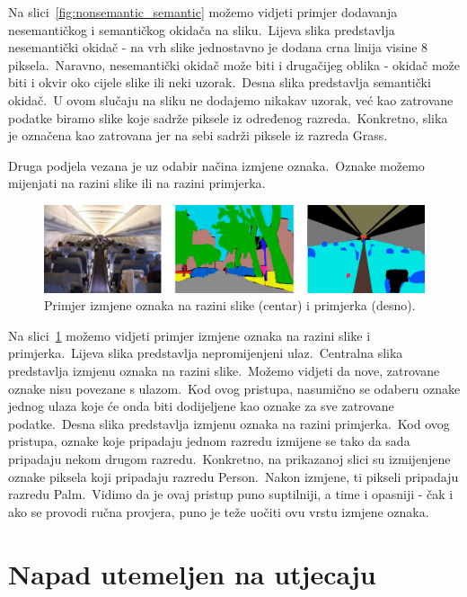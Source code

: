 \documentclass[times, utf8, seminar, numeric]{fer}
\begin{document}
Na slici~\ref{fig:nonsemantic_semantic} možemo vidjeti primjer dodavanja nesemantičkog i semantičkog okidača na sliku.\ 
Lijeva slika predstavlja nesemantički okidač - na vrh slike jednostavno je dodana crna linija visine 8 piksela.\ 
Naravno, nesemantički okidač može biti i drugačijeg oblika - okidač može biti i okvir oko cijele slike ili neki uzorak.\
Desna slika predstavlja semantički okidač.\ U ovom slučaju na sliku ne dodajemo nikakav uzorak, već kao zatrovane podatke biramo slike koje sadrže piksele iz određenog razreda.\ 
Konkretno, slika je označena kao zatrovana jer na sebi sadrži piksele iz razreda Grass.\ 
  
Druga podjela vezana je uz odabir načina izmjene oznaka.\ Oznake možemo mijenjati na razini slike ili na razini primjerka.\ 

\begin{figure}[htb]
    \centering
    \includegraphics[scale=0.45]{./Slike/badnets_finegrained.png}
    \caption{Primjer izmjene oznaka na razini slike (centar) i primjerka (desno).}
    \label{fig:badnets_finegrained}
\end{figure}

Na slici~\ref{fig:badnets_finegrained} možemo vidjeti primjer izmjene oznaka na razini slike i primjerka.\
Lijeva slika predstavlja nepromijenjeni ulaz.\ Centralna slika predstavlja izmjenu oznaka na razini slike.\ 
Možemo vidjeti da nove, zatrovane oznake nisu povezane s ulazom.\ Kod ovog pristupa, nasumično se odaberu oznake jednog ulaza koje će onda biti dodijeljene kao oznake za sve zatrovane podatke.\
Desna slika predstavlja izmjenu oznaka na razini primjerka.\ Kod ovog pristupa, oznake koje pripadaju jednom razredu izmijene se tako da sada pripadaju nekom drugom razredu.\ 
Konkretno, na prikazanoj slici su izmijenjene oznake piksela koji pripadaju razredu Person.\ Nakon izmjene, ti pikseli pripadaju razredu Palm.\
Vidimo da je ovaj pristup puno suptilniji, a time i opasniji - čak i ako se provodi ručna provjera, puno je teže uočiti ovu vrstu izmjene oznaka.\

\section{Napad utemeljen na utjecaju}
\end{document}
